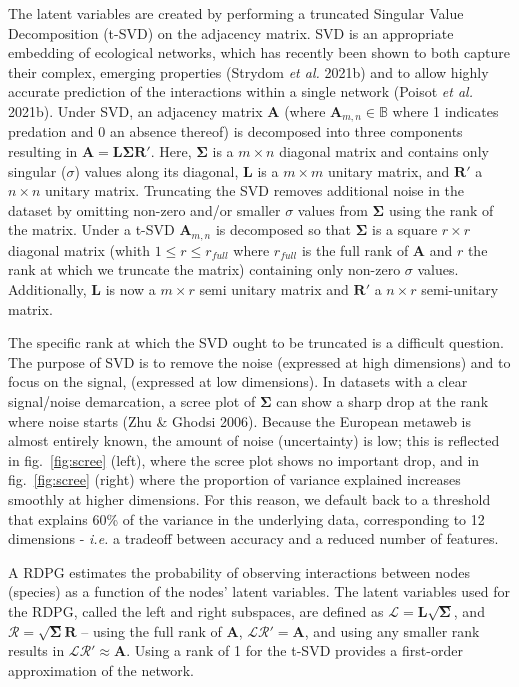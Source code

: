 \documentclass[10pt,oneside]{article}
\begin{document}
The latent variables are created by performing a truncated Singular
Value Decomposition (t-SVD) on the adjacency matrix. SVD is an
appropriate embedding of ecological networks, which has recently been
shown to both capture their complex, emerging properties (Strydom
\emph{et al.} 2021b) and to allow highly accurate prediction of the
interactions within a single network (Poisot \emph{et al.} 2021b). Under
SVD, an adjacency matrix \(\mathbf{A}\) (where
\(\mathbf{A}_{m,n}\in\mathbb{B}\) where 1 indicates predation and 0 an
absence thereof) is decomposed into three components resulting in
\(\mathbf{A} = \mathbf{L}\mathbf{\Sigma}\mathbf{R'}.\) Here,
\(\mathbf{\Sigma}\) is a \(m \times n\) diagonal matrix and contains
only singular (\(\sigma\)) values along its diagonal, \(\mathbf{L}\) is
a \(m \times m\) unitary matrix, and \(\mathbf{R}'\) a \(n \times n\)
unitary matrix. Truncating the SVD removes additional noise in the
dataset by omitting non-zero and/or smaller \(\sigma\) values from
\(\mathbf{\Sigma}\) using the rank of the matrix. Under a t-SVD
\(\mathbf{A}_{m,n}\) is decomposed so that \(\mathbf{\Sigma}\) is a
square \(r \times r\) diagonal matrix (whith \(1 \le r \le r_{full}\)
where \(r_{full}\) is the full rank of \(\mathbf{A}\) and \(r\) the rank
at which we truncate the matrix) containing only non-zero \(\sigma\)
values. Additionally, \(\mathbf{L}\) is now a \(m \times r\) semi
unitary matrix and \(\mathbf{R}'\) a \(n \times r\) semi-unitary matrix.

The specific rank at which the SVD ought to be truncated is a difficult
question. The purpose of SVD is to remove the noise (expressed at high
dimensions) and to focus on the signal, (expressed at low dimensions).
In datasets with a clear signal/noise demarcation, a scree plot of
\(\mathbf{\Sigma}\) can show a sharp drop at the rank where noise starts
(Zhu \& Ghodsi 2006). Because the European metaweb is almost entirely
known, the amount of noise (uncertainty) is low; this is reflected in
fig.~\ref{fig:scree} (left), where the scree plot shows no important
drop, and in fig.~\ref{fig:scree} (right) where the proportion of
variance explained increases smoothly at higher dimensions. For this
reason, we default back to a threshold that explains 60\% of the
variance in the underlying data, corresponding to 12 dimensions -
\emph{i.e.} a tradeoff between accuracy and a reduced number of
features.

A RDPG estimates the probability of observing interactions between nodes
(species) as a function of the nodes' latent variables. The latent
variables used for the RDPG, called the left and right subspaces, are
defined as \(\mathscr{L} = \mathbf{L}\sqrt{\mathbf{\Sigma}}\), and
\(\mathscr{R} = \sqrt{\mathbf{\Sigma}}\mathbf{R}\) -- using the full
rank of \(\mathbf{A}\), \(\mathscr{L}\mathscr{R}' = \mathbf{A}\), and
using any smaller rank results in
\(\mathscr{L}\mathscr{R}' \approx \mathbf{A}\). Using a rank of 1 for
the t-SVD provides a first-order approximation of the network.
\end{document}
